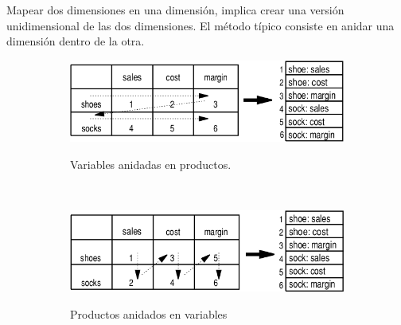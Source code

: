 \documentclass{fancyslides}
\begin{document}
\begin{frame}
\misc
{
Mapear dos dimensiones en una dimensión, implica crear una versión unidimensional de las dos dimensiones.
El método típico consiste en anidar una dimensión dentro de la otra.

\begin{figure}
        \centering
        \begin{subfigure}[b]{0.55\textwidth}
                \includegraphics[width=\textwidth]{cube_5}

                Variables anidadas en productos.
        \end{subfigure}
        
        
        \ \hfil
        
        
        \begin{subfigure}[b]{0.55\textwidth}
                \includegraphics[width=\textwidth]{cube_6}
                
                Productos anidados en variables
        \end{subfigure}
\end{figure}
}
\end{frame}
\end{document}
